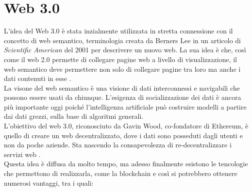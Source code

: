 \section{Web 3.0}
L'idea del Web 3.0 è stata inzialmente utilizzata in stretta connessione con il concetto di web semantico, terminologia creata da Berners Lee in un articolo di \textit{Scientific American} del 2001 per descrivere un nuovo web. 
La sua idea è che, così come il web 2.0 permette di collegare pagine web a livello di visualizzazione, il web semantico deve permettere non solo di collegare pagine tra loro ma anche i dati contenuti in esse \cite{ted_youtube}.
\\La visone del web semantico è una visione di dati interconnessi e navigabili che possono essere usati da chiunque. L'esigenza di socializzazione dei dati è ancora più importante oggi poiché l'intelligenza artificiale può costruire modelli a partire dai dati grezzi, sulla base di algoritmi generali.
\\L'obiettivo del web 3.0, riconosciuto da Gavin Wood, co-fondatore di Ethereum, è quello di creare un web decentralizzato, dove i dati sono posseduti dagli utenti e non da poche aziende. Sta nascendo la consapevolezza di re-decentralizzare i servizi web \cite{Blockchain_tecnologia_e_applicazioni_per_il_business}.
\\Questa idea è diffusa da molto tempo, ma adesso finalmente esistono le tencologie che permettono di realizzarla, come la blockchain 
e così si potrebbero ottenere numerosi vantaggi, tra i quali:
\vspace{1em}

